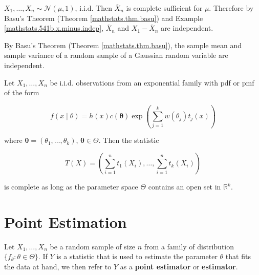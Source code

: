 \begin{example}\label{mathstats.mean.var.indep}

\(X_1, \ldots, X_n \sim \mathcal{N}(\mu, 1)\), i.i.d. Then \(\overline{X}_n\) is complete sufficient for \(\mu\). Therefore by Basu's Theorem (Theorem \ref{mathstats.thm.basu}) and Example \ref{mathstats.541b.x.minus.indep}, \(\overline{X}_n\) and \(X_1 - \overline{X}_n\) are independent.

\end{example}

\begin{example}

By Basu's Theorem (Theorem \ref{mathstats.thm.basu}), the sample mean and sample variance of a random sample of a Gaussian random variable are independent.

\end{example}

\begin{theorem}\label{mathstats.thm.comp.exp.fam}

Let \(X_1, \ldots, X_n\) be i.i.d. observations from an exponential family with pdf or pmf of the form

\[
f(x \mid \theta) = h(x) c(\boldsymbol{\theta}) \exp \left( \sum_{j=1}^k w(\theta_j)t_j(x) \right)
\]

where \(\boldsymbol{\theta} = (\theta_1, \ldots, \theta_k)\), \(\boldsymbol{\theta} \in \Theta\). Then the statistic

\[
T(X) = \left(
\sum_{i=1}^n t_1(X_i), \ldots, \sum_{i=1}^n t_k (X_i)
 \right)
\]

is complete as long as the parameter space \(\Theta\) contains an open set in \(\mathbb{R}^k\).

\end{theorem}

\section{Point Estimation}

\begin{definition} Let \(X_1, \ldots, X_n\) be a random sample of size \(n\) from a family of distribution \(\{f_\theta: \theta \in \Theta\}\). If \(Y\) is a statistic that is used to estimate the parameter \(\theta\) that fits the data at hand, we then refer to \(Y\) as a \textbf{point estimator} or \textbf{estimator}.

\end{definition}

